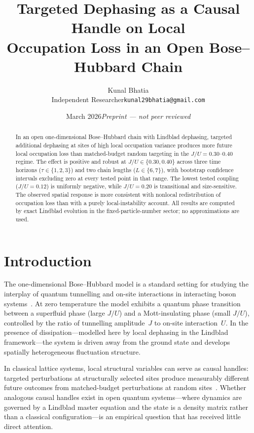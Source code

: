 \documentclass[11pt,a4paper]{article}
\title{Targeted Dephasing as a Causal Handle on Local\\
       Occupation Loss in an Open Bose--Hubbard Chain}
\author{Kunal Bhatia\\
\small Independent Researcher\quad\texttt{kunal29bhatia@gmail.com}}
\date{March 2026\quad\textit{Preprint --- not peer reviewed}}
\begin{document}
\maketitle

\begin{abstract}
In an open one-dimensional Bose--Hubbard chain with Lindblad dephasing,
targeted additional dephasing at sites of high local occupation variance
produces more future local occupation loss than matched-budget random
targeting in the $J/U=0.30$--$0.40$ regime.
The effect is positive and robust at $J/U\in\{0.30,0.40\}$ across three
time horizons ($\tau\in\{1,2,3\}$) and two chain lengths ($L\in\{6,7\}$),
with bootstrap confidence intervals excluding zero at every tested point
in that range.
The lowest tested coupling ($J/U=0.12$) is uniformly negative, while
$J/U=0.20$ is transitional and size-sensitive.
The observed spatial response is more consistent with nonlocal
redistribution of occupation loss than with a purely local-instability
account.
All results are computed by exact Lindblad evolution in the
fixed-particle-number sector; no approximations are used.
\end{abstract}

\section{Introduction}
\label{sec:intro}

The one-dimensional Bose--Hubbard model is a standard setting for studying
the interplay of quantum tunnelling and on-site interactions in interacting
boson systems~\citep{fisher1989,jaksch1998}.
At zero temperature the model exhibits a quantum phase transition between a
superfluid phase (large $J/U$) and a Mott-insulating phase (small $J/U$),
controlled by the ratio of tunnelling amplitude~$J$ to on-site
interaction~$U$.
In the presence of dissipation---modelled here by local dephasing in the
Lindblad framework---the system is driven away from the ground state and
develops spatially heterogeneous fluctuation structure.

In classical lattice systems, local structural variables can serve as
causal handles: targeted perturbations at structurally selected sites
produce measurably different future outcomes from matched-budget
perturbations at random sites~\citep{woodward2003}.
Whether analogous causal handles exist in open quantum systems---where
dynamics are governed by a Lindblad master equation and the state is a
density matrix rather than a classical configuration---is an empirical
question that has received little direct attention.
\end{document}
